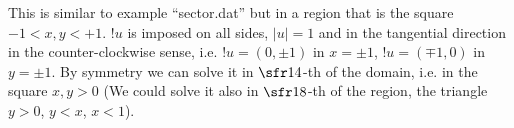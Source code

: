 
This is similar to example ``sector.dat'' but in a region that is the
square $-1<x,y<+1$. $!u$ is imposed on all sides, $|u|=1$ and in the
tangential direction in the counter-clockwise sense, i.e.
$!u=(0,\pm1)$ in $x=\pm1$, $!u=(\mp1,0)$ in $y=\pm1$. By symmetry we
can solve it in $\sfr14$-th of the domain, i.e. in the square $x,y>0$
(We could solve it also in $\sfr18$-th of the region, the triangle
$y>0$, $y<x$, $x<1$). 
